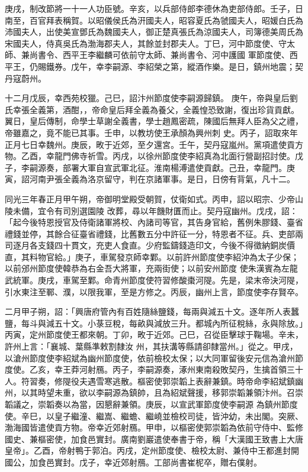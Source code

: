 \begin{pinyinscope}
 庚戌，制改節將一十一人功臣號。辛亥，以兵部侍郎李德休為吏部侍郎。壬子，日南至，百官拜表稱賀。以昭儀侯氏為汧國夫人，昭容夏氏為虢國夫人，昭媛白氏為沛國夫人，出使美宣鄧氏為魏國夫人，御正楚真張氏為涼國夫人，司簿德美周氏為宋國夫人，侍真吳氏為渤海郡夫人，其餘並封郡夫人。丁巳，河中節度使、守太師、兼尚書令、西平王李繼麟可依前守太師、兼尚書令、河中護國
 軍節度使、西平王，仍賜鐵券。戊午，幸李嗣源、李紹榮之第，縱酒作樂。是日，鎮州地震；契丹寇蔚州。


十二月戊辰，幸西苑校獵。己巳，詔汴州節度使李嗣源歸鎮。
 庚午，帝與皇后劉氏幸張全義第，酒酣，，帝命皇后拜全義為養父，全義惶恐致謝，復出珍貨貢獻。翼日，皇后傳制，命學士草謝全義書，學士趙鳳密疏，陳國后無拜人臣為父之禮，帝雖嘉之，竟不能已其事。壬申，以教坊使王承顏為興州刺
 史。丙子，詔取來年正月七日幸魏州。庚辰，畋于近郊，至夕還宮。壬午，契丹寇嵐州。黨項遣使貢方物。乙酉，幸龍門佛寺祈雪。丙戌，以徐州節度使李紹真為北面行營副招討使。戊子，李嗣源奏，部署大軍自宣武軍北征。淮南楊溥遣使貢獻。己丑，幸龍門。庚寅，詔河南尹張全義為洛京留守，判在京諸軍事。是日，日傍有背氣，凡十二。



 同光三年春正月甲午朔，帝御明堂殿受朝賀，仗衛如式。丙申，詔以昭宗、少帝山陵未備，宜令有司別選園陵
 改葬，尋以年饑財匱而止。契丹寇幽州。戊戌，詔：「起今後特恩授官及侍衛諸軍將校、內諸司等官，其告身官給，舊例朱膠錢、臺省禮錢並停，其餘合征臺省禮錢，比舊數五分中許征一分，特恩者不征。兵、吏部兩司逐月各支錢四十貫文，充吏人食直。少府監鑄錢造印文，今後不得徵納銅炭價直，其料物官給。」庚子，車駕發京師幸鄴。以前許州節度使李紹沖為太子少保；以前邠州節度使韓恭為右金吾大將軍，充兩街使；以前安州節度
 使朱漢賓為左龍武統軍。庚戌，車駕至鄴。命青州節度使符習修酸棗河隄。先是，梁末帝決河隄，引水東注至鄆、濮，以限我軍，至是方修之。丙辰，幽州上言，節度使李存賢卒。



 二月甲子朔，詔：「興唐府管內有百姓隨絲鹽錢，每兩與減五十文。逐年所人表蠶鹽，每斗與減五十文。小菉豆稅，每畝與減放三升。都城內所征稅絲，永與除放。」丙寅，定州節度使王都來朝。丁卯，畋于近郊。己巳，召從臣擊球于鞠場。辛未，許州上言：「襄城、葉縣準敕割隸汝
 州，其扶溝等縣請卻隸當州。」從之。甲戌，以滄州節度使李紹斌為幽州節度使，依前檢校太保；以大同軍留後安元信為滄州節度使。乙亥，幸王莽河射鴈。丙子，李嗣源奏，涿州東南殺敗契丹，生擒首領三十人。符習奏，修隄役夫遇雪寒逃散。樞密使郭崇韜上表辭兼鎮。時帝命李紹斌鎮幽州，以其時望未重，欲以李嗣源為鎮帥，且為紹斌聲援，移郭崇韜兼領汴州。召崇韜議之，崇韜奏以為當，因懇辭兼領。庚辰，以宣武軍節度使李嗣源
 為鎮州節度使。辛巳，以皇子繼潼、繼嵩、繼蟾、繼嶢並檢校司徒，皆沖幼，未出閣。突厥、渤海國皆遣使貢方物。帝幸近郊射鴈。甲申，以樞密使郭崇韜為依前守侍中、監修國史、兼樞密使，加食邑實封。廣南劉巖遣使奉書于帝，稱「大漢國王致書上大唐皇帝」。乙酉，帝射鴨于郭泊。丙戌，定州節度使、檢校太尉、兼侍中王都進封開國公，加食邑實封。戊子，幸近郊射鴈。工部尚書崔柅卒，贈右僕射。



\end{pinyinscope}
